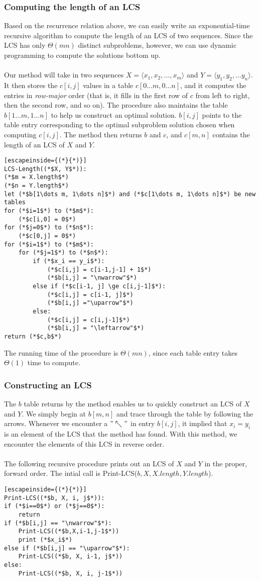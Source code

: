 \documentclass[a4paper]{article}
\begin{document}
\subsubsection{Computing the length of an LCS}
Based on the recurrence relation above, we can easily write an exponential-time recursive algorithm to compute the length of an LCS of two sequences. Since the LCS has only $\Theta(mn)$ distinct subproblems, however, we can use dynamic programming to compute the solutions bottom up.\\ \\
Our method will take in two sequences $X=\langle x_1, x_2,\dots,x_m\rangle$ and $Y = \langle y_1, y_2, \dots y_n \rangle$. It then stores the $c[i,j]$ values in a table $c[0\dots m, 0\dots n]$, and it computes the entries in \textit{row-major} order (that is, it fills in the first row of $c$ from left to right, then the second row, and so on). The procedure also maintains the table $b[1\dots m, 1\dots n]$ to help us construct an optimal solution. $b[i,j]$ points to the table entry corresponding to the optimal subproblem solution chosen when computing $c[i,j]$. The method then returns $b$ and $c$, and $c[m,n]$ contains the length of an LCS of $X$ and $Y$. 
\begin{lstlisting}[escapeinside={(*}{*)}]
LCS-Length((*$X, Y$*)):
(*$m = X.length$*)
(*$n = Y.length$*)
let (*$b[1\dots m, 1\dots n]$*) and (*$c[1\dots m, 1\dots n]$*) be new tables
for (*$i=1$*) to (*$m$*):
	(*$c[i,0] = 0$*)
for (*$j=0$*) to (*$n$*):
	(*$c[0,j] = 0$*)
for (*$i=1$*) to (*$m$*):
	for (*$j=1$*) to (*$n$*):
		if (*$x_i == y_i$*):
			(*$c[i,j] = c[i-1,j-1] + 1$*)
			(*$b[i,j] = "\nwarrow"$*)
		else if (*$c[i-1, j] \ge c[i,j-1]$*):
			(*$c[i,j] = c[i-1, j]$*) 
			(*$b[i,j] ="\uparrow"$*)
		else:
			(*$c[i,j] = c[i,j-1]$*)
			(*$b[i,j] = "\leftarrow"$*)
return (*$c,b$*)
\end{lstlisting}
The running time of the procedure is $\Theta(mn)$, since each table entry takes $\Theta(1)$ time to compute.

\subsubsection{Constructing an LCS}
The $b$ table returns by the method enables us to quickly construct an LCS of $X$ and $Y$. We simply begin at $b[m,n]$ and trace through the table by following the arrows. Whenever we encounter a $"\nwarrow"$ in entry $b[i,j]$, it implied that $x_i = y_i$ is an element of the LCS that the method has found. With this method, we encounter the elements of this LCS in reverse order.\\ \\
The following recursive procedure prints out an LCS of $X$ and $Y$ in the proper, forward order. The intial call is Print-LCS($b, X, X.length, Y.length$).\\
\begin{lstlisting}[escapeinside={(*}{*)}]
Print-LCS((*$b, X, i, j$*)):
if (*$i==0$*) or (*$j==0$*):
	return
if (*$b[i,j] == "\nwarrow"$*):
	Print-LCS((*$b,X,i-1,j-1$*))
	print (*$x_i$*)
else if (*$b[i,j] == "\uparrow"$*):
	Print-LCS((*$b, X, i-1, j$*))
else:
	Print-LCS((*$b, X, i, j-1$*))
\end{lstlisting}
\end{document}
